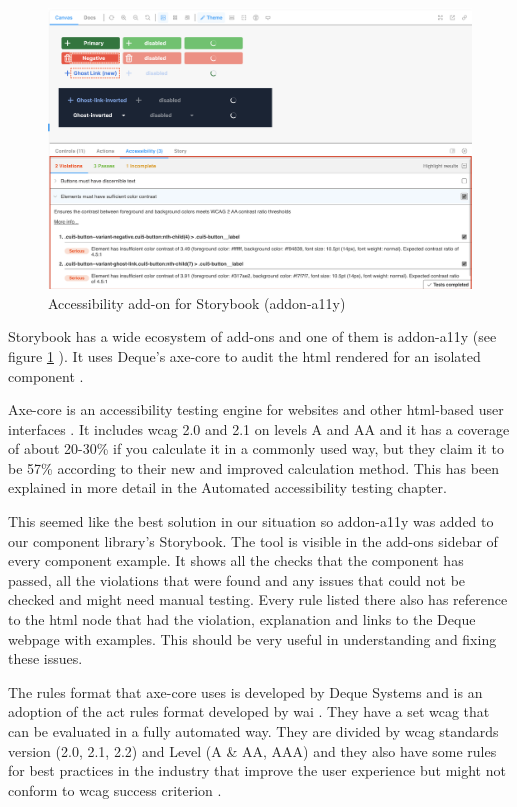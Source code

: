 \documentclass{master_thesis}
\begin{document}
\begin{figure}[H]
	\includegraphics[width=\textwidth]{img/addon-a11y.png}
	\caption{Accessibility add-on for Storybook (addon-a11y)}
	\label{fig:addon-a11y}
\end{figure}

Storybook has a wide ecosystem of add-ons and one of them is addon-a11y (see figure \ref{fig:addon-a11y} ). It uses Deque's axe-core to audit the \ac{html} rendered for an isolated component \citep{addon-a11y}.

Axe-core is an accessibility testing engine for websites and other \ac{html}-based user interfaces \citep{Deque2023}. It includes \ac{wcag} 2.0 and 2.1 on levels A and AA and it has a coverage of about 20-30\% if you calculate it in a commonly used way, but they claim it to be 57\% according to their new and improved calculation method. This has been explained in more detail in the Automated accessibility testing chapter.

This seemed like the best solution in our situation so addon-a11y was added to our component library’s Storybook. The tool is visible in the add-ons sidebar of every component example. It shows all the checks that the component has passed, all the violations that were found and any issues that could not be checked and might need manual testing. Every rule listed there also has reference to the \ac{html} node that had the violation, explanation and links to the Deque webpage with examples. This should be very useful in understanding and fixing these issues.

The rules format that axe-core uses is developed by Deque Systems and is an adoption of the \ac{act} rules format developed by \ac{wai} \citep{Fiers2017}. They have a set \ac{wcag} that can be evaluated in a fully automated way. They are divided by \ac{wcag} standards version (2.0, 2.1, 2.2) and Level (A \& AA, AAA) and they also have some rules for best practices in the industry that improve the user experience but might not conform to \ac{wcag} success criterion \citep{Fiers2023}.
\end{document}
